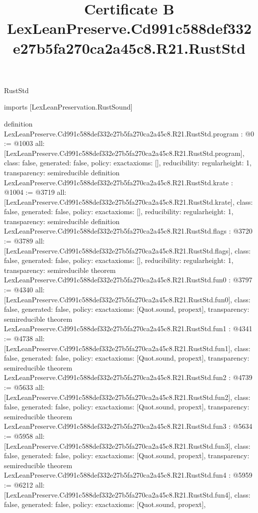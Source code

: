 \begin{lexlean}{RustStd}
\title{Certificate B LexLeanPreserve.Cd991c588def332e27b5fa270ca2a45c8.R21.RustStd}
\begin{coremodule}
imports [LexLeanPreservation.RustSound]

definition LexLeanPreserve.Cd991c588def332e27b5fa270ca2a45c8.R21.RustStd.program : @0 := @1003 {
  all: [LexLeanPreserve.Cd991c588def332e27b5fa270ca2a45c8.R21.RustStd.program],
  class: false,
  generated: false,
  policy: exact{axioms: []},
  reducibility: regular{height: 1},
  transparency: semireducible
}
definition LexLeanPreserve.Cd991c588def332e27b5fa270ca2a45c8.R21.RustStd.krate : @1004 := @3719 {
  all: [LexLeanPreserve.Cd991c588def332e27b5fa270ca2a45c8.R21.RustStd.krate],
  class: false,
  generated: false,
  policy: exact{axioms: []},
  reducibility: regular{height: 1},
  transparency: semireducible
}
definition LexLeanPreserve.Cd991c588def332e27b5fa270ca2a45c8.R21.RustStd.flags : @3720 := @3789 {
  all: [LexLeanPreserve.Cd991c588def332e27b5fa270ca2a45c8.R21.RustStd.flags],
  class: false,
  generated: false,
  policy: exact{axioms: []},
  reducibility: regular{height: 1},
  transparency: semireducible
}
theorem LexLeanPreserve.Cd991c588def332e27b5fa270ca2a45c8.R21.RustStd.fun0 : @3797 := @4340 {
  all: [LexLeanPreserve.Cd991c588def332e27b5fa270ca2a45c8.R21.RustStd.fun0],
  class: false,
  generated: false,
  policy: exact{axioms: [Quot.sound, propext]},
  transparency: semireducible
}
theorem LexLeanPreserve.Cd991c588def332e27b5fa270ca2a45c8.R21.RustStd.fun1 : @4341 := @4738 {
  all: [LexLeanPreserve.Cd991c588def332e27b5fa270ca2a45c8.R21.RustStd.fun1],
  class: false,
  generated: false,
  policy: exact{axioms: [Quot.sound, propext]},
  transparency: semireducible
}
theorem LexLeanPreserve.Cd991c588def332e27b5fa270ca2a45c8.R21.RustStd.fun2 : @4739 := @5633 {
  all: [LexLeanPreserve.Cd991c588def332e27b5fa270ca2a45c8.R21.RustStd.fun2],
  class: false,
  generated: false,
  policy: exact{axioms: [Quot.sound, propext]},
  transparency: semireducible
}
theorem LexLeanPreserve.Cd991c588def332e27b5fa270ca2a45c8.R21.RustStd.fun3 : @5634 := @5958 {
  all: [LexLeanPreserve.Cd991c588def332e27b5fa270ca2a45c8.R21.RustStd.fun3],
  class: false,
  generated: false,
  policy: exact{axioms: [Quot.sound, propext]},
  transparency: semireducible
}
theorem LexLeanPreserve.Cd991c588def332e27b5fa270ca2a45c8.R21.RustStd.fun4 : @5959 := @6212 {
  all: [LexLeanPreserve.Cd991c588def332e27b5fa270ca2a45c8.R21.RustStd.fun4],
  class: false,
  generated: false,
  policy: exact{axioms: [Quot.sound, propext]},
}
\end{coremodule}
\end{lexlean}
